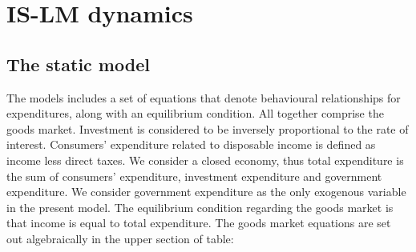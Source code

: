 \documentclass[a4paper,12pt]{report}
\begin{document}
\section{IS-LM dynamics}
\subsection{The static model}
The models includes a set of equations that denote behavioural relationships for expenditures, along with an equilibrium condition. All together comprise the goods market. Investment is considered to be inversely proportional to the rate of interest. Consumers' expenditure related to disposable income is defined as income less direct taxes. We consider a closed economy, thus total expenditure is the sum of consumers' expenditure, investment expenditure and government expenditure. We consider government expenditure as the only exogenous variable in the present model. The equilibrium condition regarding the goods market is that income is equal to total expenditure. The goods market equations are set out algebraically in the upper section of table:
\end{document}
